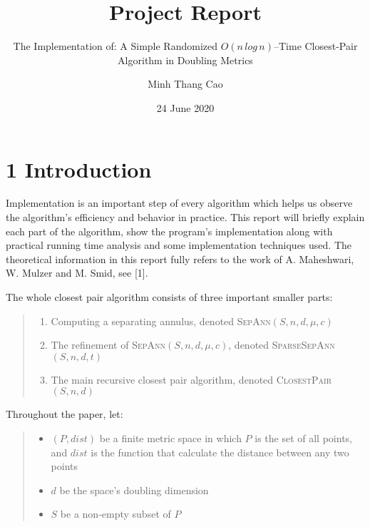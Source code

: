 \documentclass[12pt,english,]{article}
\title{Project Report}
\subtitle{The Implementation of: A Simple Randomized \(O(n\,log\, n)\)--Time
Closest-Pair Algorithm in Doubling Metrics}
\author{Minh Thang Cao}
\date{24 June 2020}
\begin{document}
\maketitle

\hypertarget{introduction}{%
\section{\texorpdfstring{1
\enspace Introduction}{1 Introduction}}\label{introduction}}

Implementation is an important step of every algorithm which helps us
observe the algorithm's efficiency and behavior in practice. This report
will briefly explain each part of the algorithm, show the program's
implementation along with practical running time analysis and some
implementation techniques used. The theoretical information in this
report fully refers to the work of A. Maheshwari, W. Mulzer and M. Smid,
see {[}1{]}.

The whole closest pair algorithm consists of three important smaller
parts:

\vspace{-2truemm}

\begin{quote}
\begin{enumerate}
\item Computing a separating annulus, denoted \textsc{SepAnn}$(S,n,d,\mu,c)$
\item The refinement of \textsc{SepAnn}$(S,n,d,\mu,c)$, denoted \textsc{SparseSepAnn}$(S,n,d,t)$
\item The main recursive closest pair algorithm, denoted \textsc{ClosestPair}$(S,n,d)$
\end{enumerate}
\end{quote}

\vspace{-2truemm}

Throughout the paper, let:

\vspace{-2truemm}

\begin{quote}
\begin{itemize}
\item $(P, dist)$ be a finite metric space in which $P$ is the set of all points, and $dist$ is the function that calculate the distance between any two points
\item $d$ be the space's doubling dimension
\item $S$ be a non-empty subset of $P$
\end{itemize}
\end{quote}
\end{document}
